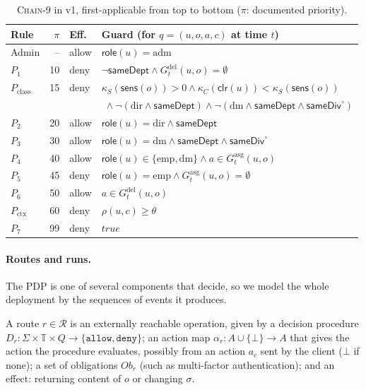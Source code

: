 \documentclass[sigconf,review,anonymous]{acmart}
\newcommand{\chain}{\textsc{Chain-9}\xspace}
\newcommand{\Pc}{P_{\mathrm{class}}}
\newcommand{\Px}{P_{\mathrm{ctx}}}
\newcommand{\Gasg}{G^{\mathrm{asg}}}
\newcommand{\Gdel}{G^{\mathrm{del}}}
\newcommand{\sameDept}{\mathsf{sameDept}}
\newcommand{\sameDiv}{\mathsf{sameDiv}}
\newcommand{\role}{\mathsf{role}}
\newcommand{\allowv}{\mathtt{allow}}
\newcommand{\denyv}{\mathtt{deny}}
\newcommand{\emp}{\mathrm{emp}}
\newcommand{\Routes}{\mathcal{R}}
\begin{document}
\begin{table}[t]
\caption{\chain in v1, first-applicable from top to bottom ($\pi$: documented priority).}
\label{tab:chain}
\small
\begin{tabular}{@{}l@{\;}r@{\;}l@{\;}l@{}}
\toprule
Rule & $\pi$ & Eff. & Guard (for $q=(u,o,a,c)$ at time $t$) \\
\midrule
Admin & -- & allow & $\role(u)=\mathrm{adm}$ \\
$P_1$ & 10 & deny & $\neg\sameDept\wedge\Gdel_t(u,o)=\emptyset$ \\
$\Pc$ & 15 & deny & $\kappa_S(\mathsf{sens}(o))>0\wedge\kappa_C(\mathsf{clr}(u))<\kappa_S(\mathsf{sens}(o))$ \\
 & & & $\;\wedge\neg(\mathrm{dir}\wedge\sameDept)\wedge\neg(\mathrm{dm}\wedge\sameDept\wedge\sameDiv^\circ)$ \\
$P_2$ & 20 & allow & $\role(u)=\mathrm{dir}\wedge\sameDept$ \\
$P_3$ & 30 & allow & $\role(u)=\mathrm{dm}\wedge\sameDept\wedge\sameDiv^\circ$ \\
$P_4$ & 40 & allow & $\role(u)\in\{\emp,\mathrm{dm}\}\wedge a\in\Gasg_t(u,o)$ \\
$P_5$ & 45 & deny & $\role(u)=\emp\wedge\Gasg_t(u,o)=\emptyset$ \\
$P_6$ & 50 & allow & $a\in\Gdel_t(u,o)$ \\
$\Px$ & 60 & deny & $\rho(u,c)\ge\theta$ \\
$P_7$ & 99 & deny & $\mathit{true}$ \\
\bottomrule
\end{tabular}
\end{table}

\paragraph{Routes and runs.} The PDP is one of several components that decide, so we model the whole deployment
by the sequences of events it produces.

\begin{definition}[Routes]\label{def:routes}
A route $r\in\Routes$ is an externally reachable operation, given by a decision procedure
$D_r:\Sigma\times\mathbb{T}\times Q\to\{\allowv,\denyv\}$; an action map $\alpha_r:A\cup\{\bot\}\to A$ that gives
the action the procedure evaluates, possibly from an action $a_c$ sent by the client ($\bot$ if none); a set of
obligations $\mathit{Ob}_r$ (such as multi-factor authentication); and an effect: returning content of $o$ or
changing $\sigma$.
\end{definition}
\end{document}
